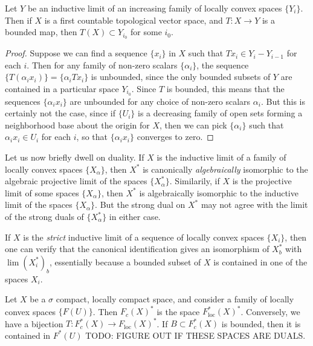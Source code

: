 \begin{theorem}
    Let $Y$ be an inductive limit of an increasing family of locally convex spaces $\{ Y_i \}$. Then if $X$ is a first countable topological vector space, and $T: X \to Y$ is a bounded map, then $T(X) \subset Y_{i_0}$ for some $i_0$.
\end{theorem}
\begin{proof}
    Suppose we can find a sequence $\{ x_i \}$ in $X$ such that $Tx_i \in Y_i - Y_{i-1}$ for each $i$. Then for any family of non-zero scalars $\{ \alpha_i \}$, the sequence $\{ T(\alpha_i x_i) \} = \{ \alpha_i Tx_i \}$ is unbounded, since the only bounded subsets of $Y$ are contained in a particular space $Y_{i_0}$. Since $T$ is bounded, this means that the sequences $\{ \alpha_i x_i \}$ are unbounded for any choice of non-zero scalars $\alpha_i$. But this is certainly not the case, since if $\{ U_i \}$ is a decreasing family of open sets forming a neighborhood base about the origin for $X$, then we can pick $\{ \alpha_i \}$ such that $\alpha_i x_i \in U_i$ for each $i$, so that $\{ \alpha_i x_i \}$ converges to zero.
\end{proof}

Let us now briefly dwell on duality. If $X$ is the inductive limit of a family of locally convex spaces $\{ X_\alpha \}$, then $X^*$ is canonically \emph{algebraically} isomorphic to the algebraic projective limit of the spaces $\{ X_\alpha^* \}$. Similarily, if $X$ is the projective limit of some spaces $\{ X_\alpha \}$, then $X^*$ is algebraically isomorphic to the inductive limit of the spaces $\{ X_\alpha \}$. But the strong dual on $X^*$ may not agree with the limit of the strong duals of $\{ X_\alpha^* \}$ in either case.

If $X$ is the \emph{strict} inductive limit of a sequence of locally convex spaces $\{ X_i \}$, then one can verify that the canonical identification gives an isomorphism of $X^*_b$ with $\lim (X_i^*)_b$, essentially because a bounded subset of $X$ is contained in one of the spaces $X_i$.

\begin{example}
    Let $X$ be a $\sigma$ compact, locally compact space, and consider a family of locally convex spaces $\{ F(U) \}$. Then $F_c(X)^*$ is the space $F^*_{\text{loc}}(X)^*$. Conversely, we have a bijection $T: F^*_c(X) \to F_{\text{loc}}(X)^*$. If $B \subset F^*_c(X)$ is bounded, then it is contained in $F^*(U)$ TODO: FIGURE OUT IF THESE SPACES ARE DUALS.
\end{example}


